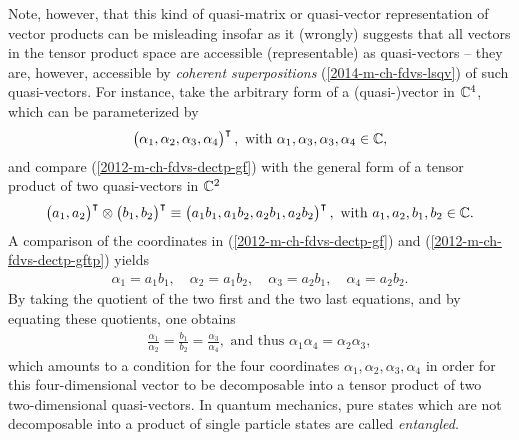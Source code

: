 Note, however, that this kind of quasi-matrix or quasi-vector representation of vector products
can be misleading insofar as
it (wrongly) suggests that all vectors in the tensor product space are accessible (representable) as quasi-vectors
-- they are, however, accessible by {\em coherent superpositions} (\ref{2014-m-ch-fdvs-lsqv})
of such quasi-vectors. \label{2012-m-c-fdvs-entanglement}
For instance, take the arbitrary form of a (quasi-)vector in ${\Bbb C}^4$, which can be parameterized by
\begin{equation}
\begin{pmatrix}\alpha_1,\alpha_2,\alpha_3,\alpha_4\end{pmatrix}^\intercal , \textrm{ with } \alpha_1,\alpha_3,\alpha_3,\alpha_4 \in {\Bbb C},
\label{2012-m-ch-fdvs-dectp-gf}
\end{equation}
and compare (\ref{2012-m-ch-fdvs-dectp-gf}) with the general form of a tensor product of two quasi-vectors in  ${\Bbb C}^2$
\begin{equation}
\begin{pmatrix}a_1,a_2\end{pmatrix}^\intercal \otimes \begin{pmatrix}b_1,b_2\end{pmatrix}^\intercal
\equiv \begin{pmatrix}a_1b_1, a_1 b_2,a_2b_1,a_2b_2\end{pmatrix}^\intercal , \textrm{ with } a_1,a_2,b_1,b_2\in {\Bbb C}.
\label{2012-m-ch-fdvs-dectp-gftp}
\end{equation}
A comparison of the coordinates in
(\ref{2012-m-ch-fdvs-dectp-gf})
and
(\ref{2012-m-ch-fdvs-dectp-gftp})
yields
\begin{equation}
\begin{split}
\alpha_1=a_1b_1,\quad
\alpha_2=a_1b_2,\quad
\alpha_3=a_2b_1,\quad
\alpha_4=a_2b_2.
\end{split}
\label{2012-m-ch-fdvs-dectp-gftp-a}
\end{equation}
By taking the quotient of the two first and the two last equations, and by equating these quotients, one obtains
\begin{equation}
\begin{split}
\frac{\alpha_1}{\alpha_2}=\frac{b_1}{b_2}
=\frac{\alpha_3}{\alpha_4},\textrm{ and thus }
{\alpha_1}{\alpha_4}={\alpha_2}{\alpha_3},
\end{split}
\label{2012-m-ch-fdvs-dectp-gftp-fr}
\end{equation}
which amounts to a condition for the four coordinates  $\alpha_1,\alpha_2,\alpha_3,\alpha_4$
in order for this four-dimensional vector to be decomposable into a tensor product of two two-dimensional quasi-vectors.
In quantum mechanics, pure states which are not decomposable into a  product of single particle states
are called {\em entangled}.


